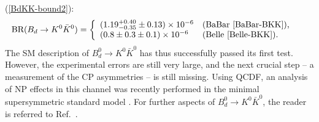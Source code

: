 \documentclass[11pt]{cernrep}
\begin{document}
(\ref{BdKK-bound2}):
\begin{equation}\label{BdK0K0-data}
\hspace*{-0.5truecm}
\mbox{BR}(B_d\to K^0\bar K^0)=\left\{
\begin{array}{ll}
(1.19^{+0.40}_{-0.35}\pm0.13) \times 10^{-6} & \mbox{(BaBar 
\cite{BaBar-BKK}),}\\
 (0.8\pm0.3\pm0.1) \times 10^{-6} & \mbox{(Belle \cite{Belle-BKK}).}
 \end{array}\right.
\end{equation}
The SM description of $B^0_d\to K^0\bar K^0$ has thus successfully passed its 
first test. However, the experimental errors are still very large, and the next crucial 
step -- a measurement of the CP asymmetries -- is still missing. Using QCDF, 
an analysis of NP effects in this channel was recently performed in the minimal 
supersymmetric standard model \cite{giri-moh}. For further aspects of 
$B^0_d\to K^0\bar K^0$, the reader is referred to Ref.~\cite{FR1}.

%
%
%
\boldmath
\end{document}
